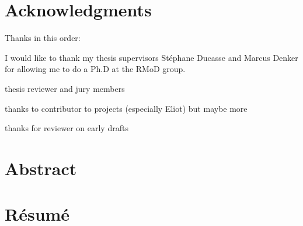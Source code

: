 \documentclass[a4paper,12pt,twoside]{includes/ThesisStyle}
\begin{document}

\dominitoc


\cleardoublepage

\section*{Acknowledgments}

Thanks in this order:

I would like to thank my thesis supervisors St\'ephane Ducasse and Marcus Denker for allowing me to do a Ph.D at the RMoD group.

thesis reviewer and jury members

thanks to contributor to projects (especially Eliot) but maybe more

thanks for reviewer on early drafts

\cleardoublepage

\section*{Abstract}



\cleardoublepage

\section*{R\'esum\'e}

\tableofcontents
\listoffigures
\listoftables

\mainmatter










\appendix






\end{document}

